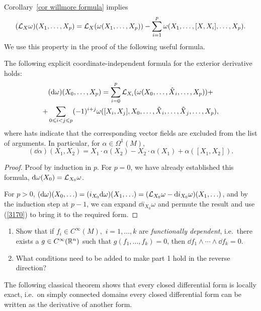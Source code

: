 Corollary~\ref{cor willmore formula} implies
\[(\mathcal{L}_X\omega) (X_1,\ldots,X_p)=\mathcal{L}_X(\omega(X_1,\ldots,X_p))-\sum_{i=1}^p\omega(X_1,\ldots,[X,X_i],\ldots,X_p).\label{3170}\]
We use this property in the proof of the following useful formula.

\begin{prop}[{{\cite[Prop.~4.1.6]{RS1}}}]\label{prop 4.1.6 RS1}
The following explicit coordinate-independent formula for the exterior derivative holds:
\begin{multline}
    (\dd\omega)(X_0,\ldots,X_{p})=\sum_{i=0}^p \Lie_{X_i}(\omega(X_0,\ldots,\wh{X}_i,\ldots,X_p))+\\+\sum_{0\leq i<j\leq p}(-1)^{i+j}\omega([X_i,X_j],X_0,\ldots,\wh{X}_i,\ldots,\wh{X}_j,\ldots,X_p),
\end{multline}
where hats indicate that the corresponding vector fields are excluded from the list of arguments. In particular, for $\alpha\in\Omega^1(M)$,
\[(\dd\alpha)(X_1,X_2)=X_1\cdot \alpha(X_2)-X_2\cdot\alpha(X_1)+\alpha ([X_1,X_2]).\]
\end{prop}
\begin{proof}
Proof by induction in $p$. For $p=0$, we have already established this formula, ${\mathrm{d}} \omega(X_0)=\mathcal{L}_{X_0}\omega$.

For $p>0$, $({\mathrm{d}}\omega)(X_0,\ldots )=(i_{X_0}{\mathrm{d}}\omega)(X_1,\ldots)=(\mathcal{L}_{X_0}\omega-{\mathrm{d}} i_{X_0}\omega)(X_1,\ldots)$, and by the induction step at $p-1$, we can expand $\dd i_{X_0}\omega$ and permute the result and use (\ref{3170}) to bring it to the required form.
\end{proof}

\begin{xca}
    \begin{enumerate}
        \item Show that if $f_i\in C^\infty(M),$ $i=1,\ldots,k$ are \emph{functionally dependent}, i.e.\ there exists a $g\in C^\infty(\mathbb{R}^n)$ such that $g(f_1,\ldots,f_k)=0$, then $\dd f_1\wedge\cdots\wedge \dd f_k=0$.
        \item What conditions need to be added to make part 1 hold in the reverse direction?
    \end{enumerate}
\end{xca}

The following classical theorem shows that every closed differential form is locally exact, i.e.\ on simply connected domains every closed differential form can be written as the derivative of another form.


